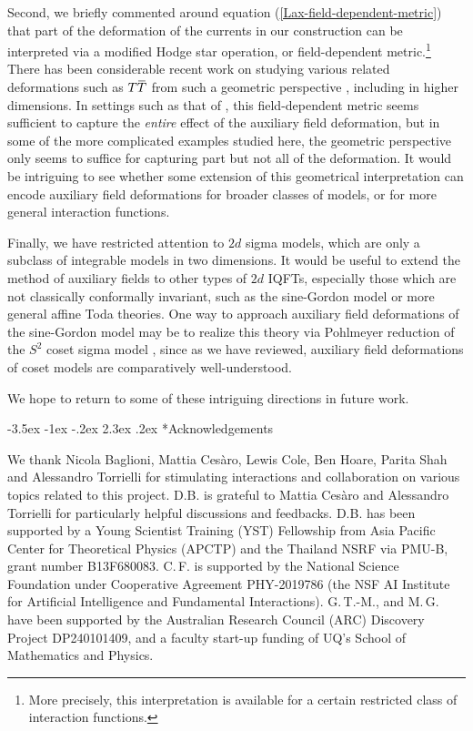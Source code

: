 \documentclass[12pt]{article}
\makeatletter
\renewcommand\section{\@startsection {section}{1}{\z@}%
                                   {-3.5ex \@plus -1ex \@minus -.2ex}%
                                   {2.3ex \@plus.2ex}%
                                   {\normalfont\large\bfseries}}
\numberwithin{equation}{section}
\newcommand{\overbar}[1]{\mkern 1.5mu\overline{\mkern-1.5mu#1\mkern-1.5mu}\mkern 1.5mu}
\def\TT{{T\overbar{T}}}
\makeatother
\begin{document}
Second, we briefly commented around equation (\ref{Lax-field-dependent-metric}) that part of the deformation of the currents in our construction can be interpreted via a modified Hodge star operation, or field-dependent metric.\footnote{More precisely, this interpretation is available for a certain restricted class of interaction functions.} There has been considerable recent work on studying various related deformations such as $\TT$ from such a geometric perspective \cite{Conti_2019,Conti:2022egv,Morone:2024ffm,Ran:2024vgl,Ran:2025xas,Conti:2019dxg,Tsolakidis:2024wut,Babaei-Aghbolagh:2024hti,Caputa:2020lpa,Brizio:2024arr,Morone:2024sdg}, including in higher dimensions. In settings such as that of \cite{Ferko:2025bhv}, this field-dependent metric seems sufficient to capture the \emph{entire} effect of the auxiliary field deformation, but in some of the more complicated examples studied here, the geometric perspective only seems to suffice for capturing part but not all of the deformation. It would be intriguing to see whether some extension of this geometrical interpretation can encode auxiliary field deformations for broader classes of models, or for more general interaction functions.

Finally, we have restricted attention to $2d$ sigma models, which are only a subclass of integrable models in two dimensions. It would be useful to extend the method of auxiliary fields to other types of $2d$ IQFTs, especially those which are not classically conformally invariant, such as the sine-Gordon model or more general affine Toda theories. One way to approach auxiliary field deformations of the sine-Gordon model may be to realize this theory via Pohlmeyer reduction of the $S^2$ coset sigma model \cite{osti_5772113}, since as we have reviewed, auxiliary field deformations of coset models are comparatively well-understood.

We hope to return to some of these intriguing directions in future work.

\section*{Acknowledgements}


We thank Nicola Baglioni, Mattia Cesàro, Lewis Cole, Ben Hoare, Parita Shah and Alessandro Torrielli for stimulating interactions and collaboration on various topics related to this project. D.B. is grateful to Mattia Cesàro and Alessandro Torrielli for particularly helpful discussions and feedbacks.
D.B. has been supported by a Young Scientist Training (YST) Fellowship from Asia Pacific Center for Theoretical Physics (APCTP) and the Thailand NSRF via PMU-B, grant number B13F680083. C.\,F. is supported by the National Science Foundation under Cooperative Agreement PHY-2019786 (the NSF AI Institute for Artificial Intelligence and Fundamental Interactions).
G.\,T.-M., and M.\,G. have been supported by the Australian Research Council (ARC) Discovery Project DP240101409, and a faculty start-up funding of UQ’s School of Mathematics and Physics. 
\end{document}
